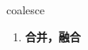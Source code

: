 
\begin{frame}
{\huge coalesce}
\begin{center}
\begin{enumerate}\Large
  \item \textbf{合并，融合}
\end{enumerate}
\end{center}
\end{frame}
